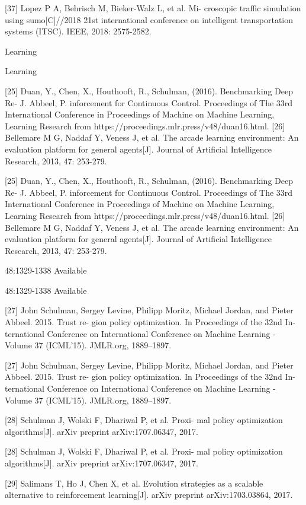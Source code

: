 \documentclass[12pt]{article}
\begin{document}
[37] Lopez P A, Behrisch M, Bieker-Walz L, et al. Mi-
croscopic traffic simulation using sumo[C]//2018 21st
international conference on intelligent transportation
systems (ITSC). IEEE, 2018: 2575-2582.


Learning


Learning


[25] Duan, Y., Chen, X., Houthooft, R., Schulman,
(2016). Benchmarking Deep Re-
J. Abbeel, P.
inforcement
for Continuous Control.
Proceedings of The 33rd International Conference
in Proceedings of Machine
on Machine Learning,
Learning Research
from
https://proceedings.mlr.press/v48/duan16.html.
[26] Bellemare M G, Naddaf Y, Veness J, et al. The
arcade learning environment: An evaluation platform
for general agents[J]. Journal of Artificial Intelligence
Research, 2013, 47: 253-279.


[25] Duan, Y., Chen, X., Houthooft, R., Schulman,
(2016). Benchmarking Deep Re-
J. Abbeel, P.
inforcement
for Continuous Control.
Proceedings of The 33rd International Conference
in Proceedings of Machine
on Machine Learning,
Learning Research
from
https://proceedings.mlr.press/v48/duan16.html.
[26] Bellemare M G, Naddaf Y, Veness J, et al. The
arcade learning environment: An evaluation platform
for general agents[J]. Journal of Artificial Intelligence
Research, 2013, 47: 253-279.


48:1329-1338 Available


48:1329-1338 Available


[27] John Schulman, Sergey Levine, Philipp Moritz,
Michael Jordan, and Pieter Abbeel. 2015. Trust re-
gion policy optimization. In Proceedings of the 32nd In-
ternational Conference on International Conference on
Machine Learning - Volume 37 (ICML’15). JMLR.org,
1889–1897.


[27] John Schulman, Sergey Levine, Philipp Moritz,
Michael Jordan, and Pieter Abbeel. 2015. Trust re-
gion policy optimization. In Proceedings of the 32nd In-
ternational Conference on International Conference on
Machine Learning - Volume 37 (ICML’15). JMLR.org,
1889–1897.


[28] Schulman J, Wolski F, Dhariwal P, et al. Proxi-
mal policy optimization algorithms[J]. arXiv preprint
arXiv:1707.06347, 2017.


[28] Schulman J, Wolski F, Dhariwal P, et al. Proxi-
mal policy optimization algorithms[J]. arXiv preprint
arXiv:1707.06347, 2017.


[29] Salimans T, Ho J, Chen X, et al. Evolution strategies
as a scalable alternative to reinforcement learning[J].
arXiv preprint arXiv:1703.03864, 2017.
\end{document}

